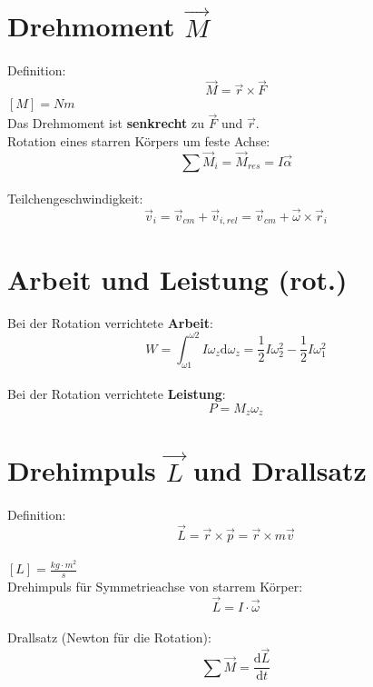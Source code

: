\section{Drehmoment $\vec{M}$}
Definition:
\[
	\boxed{
		\vec{M}=\vec{r} \times \vec{F}
	}
\]
$[M]=Nm$\\
\newline
Das Drehmoment ist \textbf{senkrecht} zu $\vec{F}$ und $\vec{r}$.\\
\newline
Rotation eines starren K\"orpers um feste Achse:
\[
	\boxed{
		\sum{\vec{M}_i}=\vec{M}_{res} = I\vec{\alpha}
	}
\]\\
\newline
Teilchengeschwindigkeit:
\[
	\boxed{
		\vec{v}_i=\vec{v}_{cm}+\vec{v}_{i,rel}=\vec{v}_{cm}+\vec{\omega}\times\vec{r}_i
	}
\]

\section{Arbeit und Leistung (rot.)}
Bei der Rotation verrichtete \textbf{Arbeit}:
\[
	\boxed{
		W=\int_{\omega 1}^{\omega 2}{I\omega_z\mathrm{d}\omega_z}=\frac{1}{2}I\omega_2^2-\frac{1}{2}I\omega_1^2
	}
\]\\
\newline
Bei der Rotation verrichtete \textbf{Leistung}:
\[
	\boxed{
		P=M_z\omega_z
	}
\]

\section{Drehimpuls $\vec{L}$ und Drallsatz}
Definition:
\[
	\boxed{
		\vec{L}=\vec{r}\times\vec{p}=\vec{r}\times m\vec{v}
	}
\]\\
$[L]=\frac{kg\cdot m^2}{s}$\\
\newline
Drehimpuls f\"ur Symmetrieachse von starrem K\"orper:
\[
	\boxed{
		\vec{L}=I\cdot\vec{\omega}
	}
\]\\
\newline
Drallsatz (Newton f\"ur die Rotation):
\[
	\boxed{
		\sum{\vec{M}}=\frac{\mathrm{d}\vec{L}}{\mathrm{d}t}
	}
\]
\newpage
